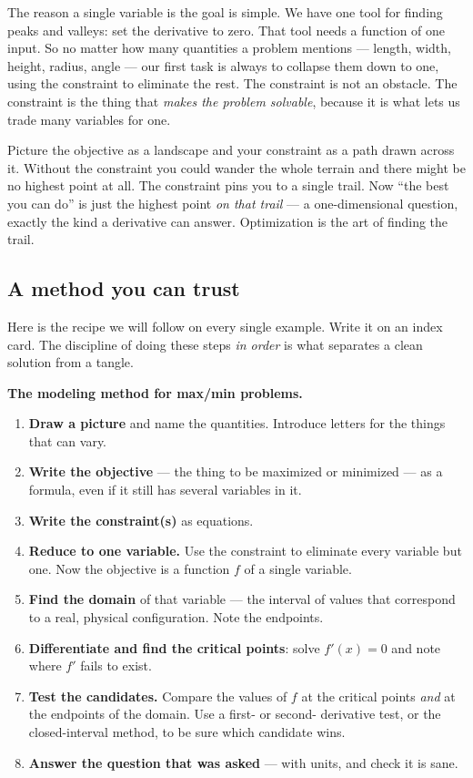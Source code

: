 The reason a single variable is the goal is simple. We have one tool for finding
peaks and valleys: set the derivative to zero. That tool needs a function of one
input. So no matter how many quantities a problem mentions --- length, width, height,
radius, angle --- our first task is always to collapse them down to one, using the
constraint to eliminate the rest. The constraint is not an obstacle. The constraint
is the thing that \emph{makes the problem solvable}, because it is what lets us trade
many variables for one.

\begin{intuitionbox}
Picture the objective as a landscape and your constraint as a path drawn across it.
Without the constraint you could wander the whole terrain and there might be no
highest point at all. The constraint pins you to a single trail. Now ``the best you
can do'' is just the highest point \emph{on that trail} --- a one-dimensional
question, exactly the kind a derivative can answer. Optimization is the art of
finding the trail.
\end{intuitionbox}

\subsection{A method you can trust}

Here is the recipe we will follow on every single example. Write it on an index
card. The discipline of doing these steps \emph{in order} is what separates a clean
solution from a tangle.

\begin{focusbox}
\textbf{The modeling method for max/min problems.}
\begin{enumerate}
  \item \textbf{Draw a picture} and name the quantities. Introduce letters for the
    things that can vary.
  \item \textbf{Write the objective} --- the thing to be maximized or minimized ---
    as a formula, even if it still has several variables in it.
  \item \textbf{Write the constraint(s)} as equations.
  \item \textbf{Reduce to one variable.} Use the constraint to eliminate every
    variable but one. Now the objective is a function $f$ of a single variable.
  \item \textbf{Find the domain} of that variable --- the interval of values that
    correspond to a real, physical configuration. Note the endpoints.
  \item \textbf{Differentiate and find the critical points}: solve $f'(x)=0$ and note
    where $f'$ fails to exist.
  \item \textbf{Test the candidates.} Compare the values of $f$ at the critical
    points \emph{and} at the endpoints of the domain. Use a first- or second-
    derivative test, or the closed-interval method, to be sure which candidate wins.
  \item \textbf{Answer the question that was asked} --- with units, and check it is
    sane.
\end{enumerate}
\end{focusbox}

